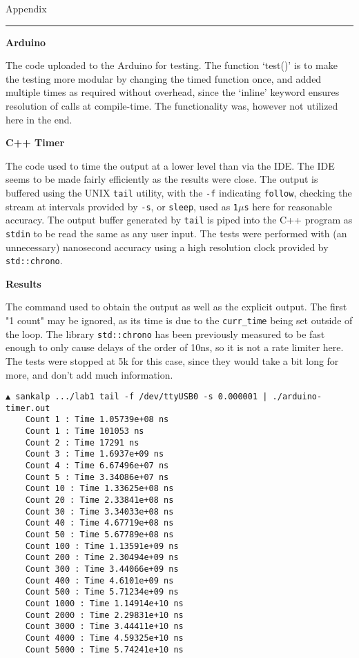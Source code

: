 \newpage
{\large Appendix}
\hrule
\label{appendix}

\textbf{Arduino}
\label{appendix:arduino}

The code uploaded to the Arduino for testing. The function
`test()' is to make the testing more modular by changing the timed
function once, and added multiple times as required without overhead,
since the `inline' keyword ensures resolution of calls at compile-time.
The functionality was, however not utilized here in the end.



\textbf{C++ Timer}
\label{appendix:cpp}

The code used to time the output at a lower level than via the IDE.
The IDE seems to be made fairly efficiently as the results were close.
The output is buffered using the UNIX \texttt{tail} utility, with the \texttt{-f}
indicating \texttt{follow}, checking the stream at intervals provided by \texttt{-s},
or \texttt{sleep}, used as \texttt{1$\mu$s} here for reasonable accuracy. The output 
buffer generated by \texttt{tail} is piped into the C++ program as \texttt{stdin} to
be read the same as any user input. The tests were performed with (an unnecessary)
nanosecond accuracy using a high resolution clock provided by \texttt{std::chrono}.




\textbf{Results}
\label{appendix:results}

The command used to obtain the output as well as the explicit output.
The first "1 count" may be ignored, as its time is due to the \texttt{curr\_time}
being set outside of the loop. The library \texttt{std::chrono} has been previously
measured to be fast enough to only cause delays of the order of 10ns, so it is 
not a rate limiter here. The tests were stopped at 5k for this case, since they would
take a bit long for more, and don't add much information.

\begin{verbatim}
▲ sankalp .../lab1 tail -f /dev/ttyUSB0 -s 0.000001 | ./arduino-timer.out
    Count 1 : Time 1.05739e+08 ns
    Count 1 : Time 101053 ns
    Count 2 : Time 17291 ns
    Count 3 : Time 1.6937e+09 ns
    Count 4 : Time 6.67496e+07 ns
    Count 5 : Time 3.34086e+07 ns
    Count 10 : Time 1.33625e+08 ns
    Count 20 : Time 2.33841e+08 ns
    Count 30 : Time 3.34033e+08 ns
    Count 40 : Time 4.67719e+08 ns
    Count 50 : Time 5.67789e+08 ns
    Count 100 : Time 1.13591e+09 ns
    Count 200 : Time 2.30494e+09 ns
    Count 300 : Time 3.44066e+09 ns
    Count 400 : Time 4.6101e+09 ns
    Count 500 : Time 5.71234e+09 ns
    Count 1000 : Time 1.14914e+10 ns
    Count 2000 : Time 2.29831e+10 ns
    Count 3000 : Time 3.44411e+10 ns
    Count 4000 : Time 4.59325e+10 ns
    Count 5000 : Time 5.74241e+10 ns
\end{verbatim}

